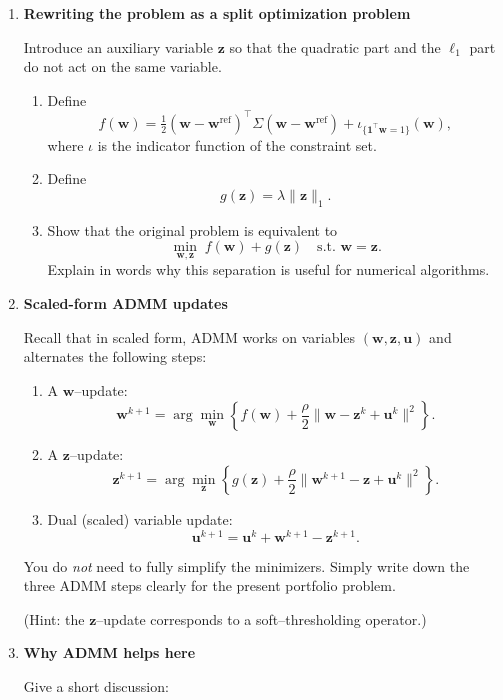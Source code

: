 \documentclass[11pt]{article}
\begin{document}
\begin{enumerate}
\bigskip

\begin{enumerate}

\item \textbf{Rewriting the problem as a split optimization problem}

Introduce an auxiliary variable $\bm{z}$ so that the quadratic part and the $\ell_1$ part do not act on the same variable.

\begin{enumerate}
\item Define
\[
f(\bm{w}) = \tfrac{1}{2}(\bm{w}-\bm{w}^{\mathrm{ref}})^\top \Sigma (\bm{w}-\bm{w}^{\mathrm{ref}})
+ \iota_{\{\bm{1}^\top \bm{w}=1\}}(\bm{w}),
\]
where $\iota$ is the indicator function of the constraint set.
\item Define
\[
g(\bm{z})=\lambda\|\bm{z}\|_1.
\]
\item Show that the original problem is equivalent to
\[
\min_{\bm{w},\bm{z}} \; f(\bm{w}) + g(\bm{z})
\quad \text{s.t. } \bm{w}=\bm{z}.
\]
Explain in words why this separation is useful for numerical algorithms.
\end{enumerate}

\item \textbf{Scaled-form ADMM updates}

Recall that in scaled form, ADMM works on variables $(\bm{w},\bm{z},\bm{u})$ and alternates the following steps:

\begin{enumerate}
\item A $\bm{w}$–update:
\[
\bm{w}^{k+1}
=
\arg\min_{\bm{w}}
\left\{
f(\bm{w})+\frac{\rho}{2}\|\bm{w}-\bm{z}^k+\bm{u}^k\|^2
\right\}.
\]
\item A $\bm{z}$–update:
\[
\bm{z}^{k+1}
=
\arg\min_{\bm{z}}
\left\{
g(\bm{z})+\frac{\rho}{2}\|\bm{w}^{k+1}-\bm{z}+\bm{u}^k\|^2
\right\}.
\]
\item Dual (scaled) variable update:
\[
\bm{u}^{k+1}
=
\bm{u}^k+\bm{w}^{k+1}-\bm{z}^{k+1}.
\]
\end{enumerate}

You do \emph{not} need to fully simplify the minimizers.  
Simply write down the three ADMM steps clearly for the present portfolio problem.

(Hint: the $\bm{z}$–update corresponds to a soft–thresholding operator.)

\item \textbf{Why ADMM helps here}

Give a short discussion:


\end{enumerate}
\end{enumerate}
\end{document}
